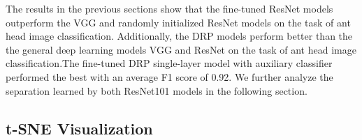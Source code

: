 \documentclass{aci}
\numberwithin{equation}{section}
\begin{document}
\FloatBarrier
The results in the previous sections show that the fine-tuned ResNet models
outperform the VGG and randomly initialized ResNet models on the task of ant
head image classification. Additionally, the DRP models perform better than the
the general deep learning models VGG and ResNet on the task of ant head image
classification.The fine-tuned DRP single-layer model with auxiliary classifier
performed the best with an average F1 score of 0.92. We further analyze the
separation learned by both ResNet101 models in the following section.



\subsection{t-SNE Visualization}
\end{document}
